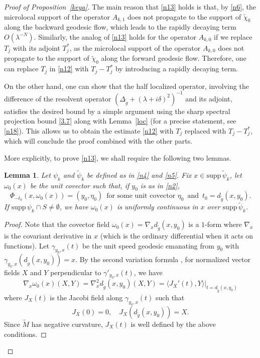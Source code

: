 \documentclass[10pt]{amsart}
\newtheorem{lemma}[theorem]{Lemma}
\newcommand{\la}{\lambda}
\newcommand{\supp}{\mathrm{supp }}
\newcommand{\1}{{\bf 1}}
\begin{document}
\begin{proof}[Proof of Proposition~\ref{keya}]
The main reason that \eqref{n13} holds is that, by \eqref{n6}, the microlocal support of the operator $A_{k,1}$ does not propagate to the support of 
$\tilde\chi_0$
  along the backward geodesic flow, which leads to the rapidly decaying term $O(\la^{-N})$. Similarly, the analog of \eqref{n13} holds for the operator $A_{k,0}$ if we replace $T_j$ with its adjoint $T_j^*$, as the microlocal support of the operator $A_{k,0}$ does not propagate to the support of 
$\tilde\chi_0$
  along the forward geodesic flow.  Therefore, one can replace $T_j$ in \eqref{n12} with $T_j-T_j^*$ by introducing a rapidly decaying term.
  
  On the other hand,  one can show that the half localized operator, involving the difference of the resolvent operator $(\Delta_{\tilde g}+(\la+i\delta)^2)^{-1}$ and its adjoint, satisfies the desired bound by a simple argument using the sharp spectral projection bound \eqref{3.7} along with Lemma~\ref{loc} (for a precise statement, see \eqref{n18}). This  allows us to obtain the estimate \eqref{n12} with $T_j$ replaced with $T_j-T_j^*$, which will conclude the proof combined with the other parts.





More explicitly, to prove \eqref{n13}, we shall require the following two lemmas.
\begin{lemma}\label{uniform}
Let $\psi_k$ and $\tilde \psi_k$ be defined as in \eqref{n4} and \eqref{n5}.
    Fix $x\in \supp \,\tilde\psi_k$, let $\omega_0(x)$ be the unit covector such that, 
    if $y_0$ is as in \eqref{n2},
    \begin{equation}\label{omega}
        \Phi_{-t_0}(x,\omega_0(x))=(y_0,\eta_0)\,\,\,\text{for some unit covector} \,\,\eta_0\,\,\, \text{and} \,\,\,t_0=d_{\tilde g}(x,y_0).
    \end{equation}
    If $\supp\,\psi_k \cap S\neq \emptyset$, we have
    $\omega_0(x)$ is uniformly continuous in $x$ over $\supp\,\tilde \psi_k$.
\end{lemma}
\begin{proof}
Note that the covector field $\omega_0(x)=\nabla_x d_{\tilde g}(x,y_0)$ is a $1$-form where $\nabla_x$ is the covariant derivative in $x$ (which is the ordinary differential when it acts on functions). Let $\gamma_{y_0,x}(t)$ be the unit speed geodesic emanating from $y_0$ with $\gamma_{y_0,x}(d_{\tilde g}(x,y_0))=x$. By the second variation formula \cite[(1.17)]{CheegerEbin}, for normalized vector fields $X$ and $Y$ perpendicular to $\gamma'_{y_0,x}(t)$, we have
\begin{equation*}
    \nabla_x  \omega_0(x)(X,Y)=\nabla_x^2 d_{\tilde g}(x,y_0)(X,Y)= \langle J_X'(t),Y\rangle|_{t=d_{\tilde g}(x,y_0)}
\end{equation*}
where $J_X(t)$ is the Jacobi field along $\gamma_{y_0,x}(t)$ such that
$$J_X(0)=0,\quad J_X(d_{\tilde g}(x,y_0))=X.$$
{Since $\tilde{M}$ has negative curvature, $J_X(t)$ is well defined by the above conditions.}


\end{proof}
\end{proof}
\end{document}
